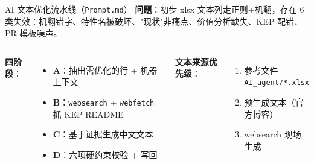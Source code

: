 \documentclass[aspectratio=169,UTF8]{beamer}
\begin{document}
\begin{frame}{AI 文本优化流水线（\texttt{Prompt.md}）}
  \footnotesize\textbf{问题}：初步 xlsx 文本列走正则+机翻，存在 6 类失效：机翻错字、特性名被破坏、"现状"非痛点、价值分析缺失、KEP 配错、PR 模板噪声。

  \vspace{0.2em}
  \begin{center}
  \end{center}

  \vspace{0.1em}
  \scriptsize
  \begin{columns}[T]
    \textbf{四阶段}：
    \begin{itemize}\setlength\itemsep{0.02em}
      \item \textbf{A}：抽出需优化的行 + 机器上下文
      \item \textbf{B}：\texttt{websearch} + \texttt{webfetch} 抓 KEP README
      \item \textbf{C}：基于证据生成中文文本
      \item \textbf{D}：六项硬约束校验 + 写回
    \end{itemize}
    \textbf{文本来源优先级}：
    \begin{enumerate}\setlength\itemsep{0.02em}
      \item 参考文件 \texttt{AI\_agent/*.xlsx}
      \item 预生成文本（官方博客）
      \item websearch 现场生成
    \end{enumerate}
  \end{columns}


\end{frame}
\end{document}
